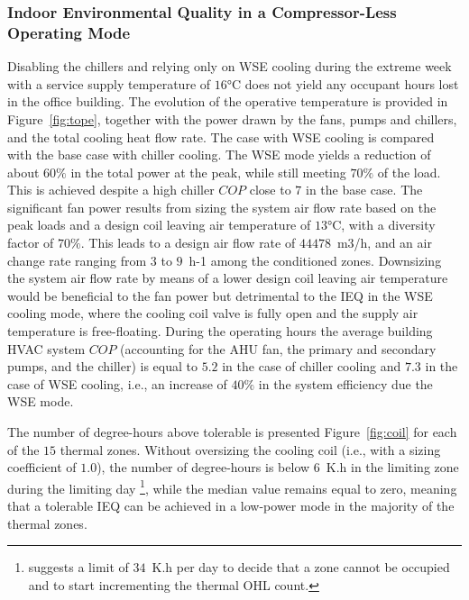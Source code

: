 \subsubsection{Indoor Environmental Quality in a Compressor-Less Operating Mode} \label{sec:ieq}

Disabling the chillers and relying only on WSE cooling during the extreme week with a service supply temperature of $16$°C does not yield any occupant hours lost in the office building.
The evolution of the operative temperature is provided in Figure~\ref{fig:tope}, together with the power drawn by the fans, pumps and chillers, and the total cooling heat flow rate. The case with WSE cooling is compared with the base case with chiller cooling.
The WSE mode yields a reduction of about $60\%$ in the total power at the peak, while still meeting $70\%$ of the load.
This is achieved despite a high chiller $COP$ close to $7$ in the base case.
The significant fan power results from sizing the system air flow rate based on the peak loads and a design coil leaving air temperature of $13$°C, with a diversity factor of $70\%$. This leads to a design air flow rate of $44478$~m3/h, and an air change rate ranging from $3$ to $9$~h-1 among the conditioned zones. Downsizing the system air flow rate by means of a lower design coil leaving air temperature would be beneficial to the fan power but detrimental to the IEQ in the WSE cooling mode, where the cooling coil valve is fully open and the supply air temperature is free-floating.
During the operating hours the average building HVAC system $COP$ (accounting for the AHU fan, the primary and secondary pumps, and the chiller) is equal to $5.2$ in the case of chiller cooling and $7.3$ in the case of WSE cooling, i.e., an increase of $40\%$ in the system efficiency due the WSE mode.

The number of degree-hours above tolerable is presented Figure~\ref{fig:coil} for each of the $15$ thermal zones.
Without oversizing the cooling coil (i.e., with a sizing coefficient of $1.0$), the number of degree-hours is below $6$~K.h in the limiting zone during the limiting day%
\footnote{%
\cite{Mathew2021} suggests a limit of $34$~K.h per day to decide that a zone cannot be occupied and to start incrementing the thermal OHL count.}, while the median value remains equal to zero, meaning that a tolerable IEQ can be achieved in a low-power mode in the majority of the thermal zones.


